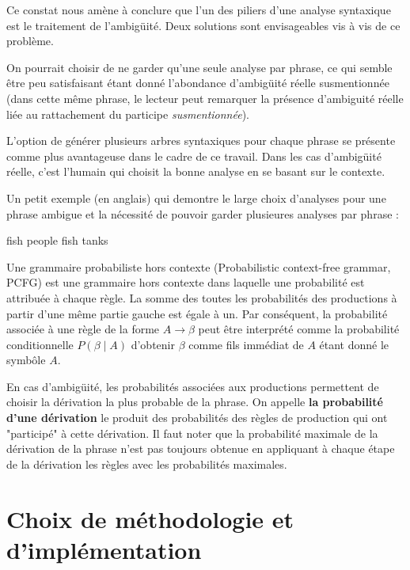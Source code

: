 \documentclass[12pt]{article}
\begin{document}
Ce constat nous am\`ene \`a conclure que l'un des piliers d'une
analyse syntaxique est le traitement de l'ambig\"uit\'e. Deux solutions sont
envisageables vis \`a vis de ce probl\`eme.\par

On pourrait choisir de ne garder qu'une seule analyse par phrase, ce qui semble \^etre peu satisfaisant \'etant
donn\'e l'abondance d'ambig\"uit\'e r\'eelle susmentionn\'ee (dans cette m\^eme phrase, le
lecteur peut remarquer la pr\'esence d'ambiguit\'e r\'eelle li\'ee au rattachement du
participe \emph{susmentionn\'ee}). \par

L'option de g\'en\'erer plusieurs arbres syntaxiques pour chaque phrase se pr\'esente comme
plus avantageuse dans le cadre de ce travail. Dans les cas d'ambig\"uit\'e
r\'eelle, c'est l'humain qui choisit la bonne analyse en se basant sur le
contexte. \par

Un petit exemple (en anglais) qui demontre le large
choix d'analyses pour une phrase ambigue et la n\'ecessit\'e de pouvoir garder plusieures analyses par phrase :

\begin{exe}
\ex fish people fish tanks
\end{exe}

Une grammaire probabiliste hors contexte (Probabilistic context-free grammar,
PCFG) est une grammaire hors contexte dans laquelle une probabilit\'e est
attribu\'ee \`a chaque r\`egle. La somme des toutes les probabilit\'es des
productions \`a partir d'une m\^eme partie gauche est \'egale \`a un. Par cons\'equent, 
la probabilit\'e associ\'ee \`a une r\`egle de la forme $A \rightarrow \beta$ peut \^etre interpr\'et\'e
comme la probabilit\'e conditionnelle $P(\beta \mid A)$ d'obtenir $\beta$ comme fils imm\'ediat de $A$ \'etant
donn\'e le symb\^ole $A$. \par

En cas d'ambig\"uit\'e, les probabilit\'es associ\'ees aux productions permettent
de choisir la d\'erivation la plus probable de la phrase. On appelle \textbf{la
probabilit\'e d'une d\'erivation} le produit des probabilit\'es des r\`egles de
production qui ont "particip\'e" \`a cette d\'erivation. Il faut noter que la
probabilit\'e maximale de la d\'erivation de la phrase n'est pas toujours obtenue
en appliquant \`a chaque \'etape de la d\'erivation les r\`egles avec les probabilit\'es
maximales. 

\section{Choix de m\'ethodologie et d'impl\'ementation}
\end{document}

